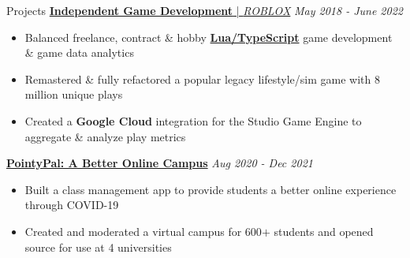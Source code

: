 \documentclass{resume/resume}
\begin{document}
\begin{rSection}{Projects}
  \href{https://spelkington.github.io/categories/#Roblox}{{\bf Independent Game Development} | {\em ROBLOX}} \hfill {\em May 2018 - June 2022}
  \vspace{-6pt}
  \begin{itemize}[nosep]
    \item Balanced freelance, contract \& hobby \href{https://github.com/search?p=1&q=user\%3ASpelkington+extension\%3Ats+extension\%3Atsx+extension\%3Alua&type=Code}{\bf Lua/TypeScript} game development \& game data analytics
    \item Remastered \& fully refactored a popular legacy lifestyle/sim game with 8 million unique plays
    \item Created a {\bf Google Cloud} integration for the Studio Game Engine to aggregate \& analyze play metrics
  \end{itemize}

  \href{https://github.com/UtahTriangle/pointypal#pointypal-zoom-school-done-better}{\bf PointyPal: A Better Online Campus} \hfill {\em Aug 2020 - Dec 2021}
  \vspace{-6pt}
  \begin{itemize}[nosep]
    \item Built a class management app to provide students a better online experience through COVID-19
    \item Created and moderated a virtual campus for 600$+$ students and opened source for use at 4 universities
  \end{itemize}



\end{rSection}
\end{document}
